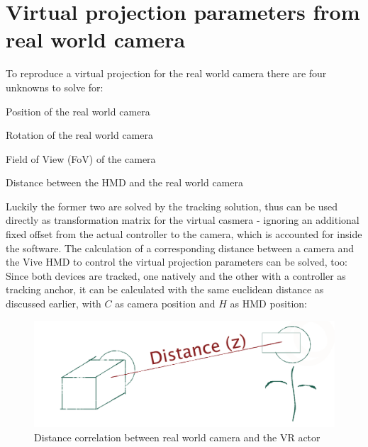 %
\section{Virtual projection parameters from real world camera}
\label{sec:projection-params}
To reproduce a virtual projection for the real world camera there are four 
unknowns to solve for:

\begin{my_list}
	\item Position of the real world camera
	\item Rotation of the real world camera
	\item Field of View (FoV) of the camera
	\item Distance between the HMD and the real world camera
\end{my_list}

Luckily the former two are solved by the tracking solution, thus can be used 
directly as transformation matrix for the virtual casmera - ignoring an 
additional fixed offset from the actual controller to the camera, which is 
accounted for inside the software.
\newline
The calculation of a corresponding distance between a camera and the Vive HMD 
to control the virtual projection parameters can be solved, too: Since both 
devices are tracked, one natively and the other with a controller as 
tracking anchor, it can be calculated with the same euclidean distance as 
discussed earlier, with $C$ as camera position and $H$ as HMD position:


\begin{figure}[htb]
	\includegraphics[width=\textwidth]{_raw_resources/composition/Composition-Z-Distance.png}
	\caption{Distance correlation between real world camera and the VR actor}
	\label{fig:projection:distance}
\end{figure}

